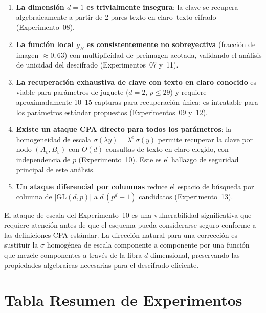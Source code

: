 \documentclass[12pt,a4paper]{article}
\theoremstyle{definition}
\newcommand{\GL}{\mathrm{GL}}
\begin{document}
\begin{enumerate}
  \item \textbf{La dimensión $d = 1$ es trivialmente insegura}: la
    clave se recupera algebraicamente a partir de 2 pares
    texto en claro--texto cifrado (Experimento~08).

  \item \textbf{La función local $g_B$ es consistentemente no
    sobreyectiva} (fracción de imagen $\approx 0{,}63$) con
    multiplicidad de preimagen acotada, validando el análisis de
    unicidad del descifrado (Experimentos~07 y~11).

  \item \textbf{La recuperación exhaustiva de clave con texto en
    claro conocido} es viable para parámetros de juguete ($d = 2$,
    $p \leq 29$) y requiere aproximadamente 10--15 capturas para
    recuperación única; es intratable para los parámetros estándar
    propuestos (Experimentos~09 y~12).

  \item \textbf{Existe un ataque CPA directo para todos los
    parámetros}: la homogeneidad de escala
    $\sigma(\lambda y) = \lambda^e\,\sigma(y)$ permite recuperar la
    clave por nodo $(A_v, B_v)$ con $O(d)$ consultas de texto en
    claro elegido, con independencia de $p$ (Experimento~10). Este
    es el hallazgo de seguridad principal de este análisis.

  \item \textbf{Un ataque diferencial por columnas} reduce el espacio
    de búsqueda por columna de $|\GL(d,p)|$ a $d\,(p^d - 1)$
    candidatos (Experimento~13).
\end{enumerate}

El ataque de escala del Experimento~10 es una vulnerabilidad
significativa que requiere atención antes de que el esquema pueda
considerarse seguro conforme a las definiciones CPA estándar. La
dirección natural para una corrección es sustituir la $\sigma$
homogénea de escala componente a componente por una función que mezcle
componentes a través de la fibra $d$-dimensional, preservando las
propiedades algebraicas necesarias para el descifrado eficiente.

\section*{Tabla Resumen de Experimentos}
\end{document}
